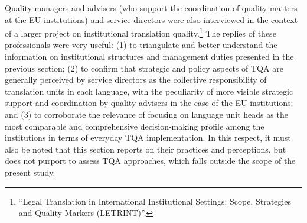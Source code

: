 \documentclass[output=paper]{langsci/langscibook}
\begin{document}
Quality managers and advisers (who support the coordination of quality matters at the EU institutions) and service directors were also interviewed in the context of a larger project on institutional translation quality.\footnote{“Legal Translation in International Institutional Settings: Scope, Strategies and Quality Markers (LETRINT)”.} The replies of these professionals were very useful: (1) to triangulate and better understand the information on institutional structures and management duties presented in the previous section; (2) to confirm that strategic and policy aspects of TQA are generally perceived by service directors as the collective responsibility of translation units in each language, with the peculiarity of more visible strategic support and coordination by quality advisers in the case of the EU institutions; and (3) to corroborate the relevance of focusing on language unit heads as the most comparable and comprehensive decision-making profile among the institutions in terms of everyday TQA implementation. In this respect, it must also be noted that this section reports on their practices and perceptions, but does not purport to assess TQA approaches, which falls outside the scope of the present study.  
\end{document}
